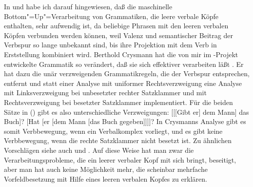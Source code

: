 In  und  habe ich darauf hingewiesen,
daß die maschinelle Bottom"=Up"=Verarbeitung von Grammatiken, die leere verbale Köpfe enthalten, sehr aufwendig
ist, da beliebige Phrasen mit den leeren verbalen Köpfen verbunden werden können, weil
Valenz und semantischer Beitrag der Verbspur so lange unbekannt sind, bis ihre Projektion
mit dem Verb in Erststellung kombiniert wird. 
%
Berthold Crysmann hat die von mir im \verbmobil-Projekt
entwickelte Grammatik \citep{MK2000a} so verändert, daß sie sich effektiver verarbeiten läßt \citep{Crysmann2003b}.
Er hat dazu die unär verzweigenden Grammatikregeln, die der Verbspur entsprechen, entfernt und statt einer
Analyse mit uniformer Rechtsverzweigung eine Analyse mit Linksverzweigung bei unbesetzter
rechter Satzklammer und mit Rechtsverzweigung bei besetzter Satzklammer implementiert.
Für die beiden Sätze in () gibt es also unterschiedliche Verzweigungen:
\eal
\ex {}[[[Gibt er] dem Mann] das Buch]?
\ex {}[Hat [er [dem Mann [das Buch gegeben]]]]?
\zl
In Crysmanns Analyse gibt es somit Verbbewegung, wenn ein Verbalkomplex vorliegt, und es
gibt keine Verbbewegung, wenn die rechte Satzklammer nicht besetzt ist.
Zu ähnlichen Vorschlägen siehe auch  und .
Auf diese Weise hat man zwar die Verarbeitungsprobleme, die ein leerer verbaler Kopf mit sich
bringt, beseitigt, aber man hat auch keine Möglichkeit mehr, die scheinbar mehrfache
Vorfeldbesetzung mit Hilfe eines leeren verbalen Kopfes zu erklären.


